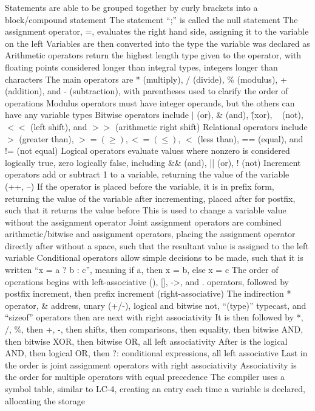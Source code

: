 \documentclass[11 pt, twoside]{article}
\newenvironment{outline*}
{
	\begin{outline}[enumerate]
	}
	{\end{outline}
}
\begin{document}
\begin{outline*}
\2 Statements are able to be grouped together by curly brackets into a block/compound statement
\2 The statement ``;'' is called the null statement
\2 The assignment operator, =, evaluates the right hand side, assigning it to the variable on the left
\3 Variables are then converted into the type the variable was declared as
\2 Arithmetic operators return the highest length type given to the operator, with floating points considered longer than integral types, integers longer than characters
\3 The main operators are * (multiply), / (divide), \% (modulus), +(addition), and - (subtraction), with parentheses used to clarify the order of operations
\3 Modulus operators must have integer operands, but the others can have any variable types
\2 Bitwise operators include $|$ (or), \& (and), \^ (xor), ~ (not), $<<$ (left shift), and $>>$ (arithmetic right shift)
\2 Relational operators include $>$ (greater than), $>= (\geq), <= (\leq)$, $<$ (less than), == (equal), and != (not equal)
\2 Logical operators evaluate values where nonzero is considered logically true, zero logically false, including \&\& (and), || (or), ! (not)
\2 Increment operators add or subtract 1 to a variable, returning the value of the variable (++, --)
\3 If the operator is placed before the variable, it is in prefix form, returning the value of the variable after incrementing, placed after for postfix, such that it returns the value before
\3 This is used to change a variable value without the assignment operator
\2 Joint assignment operators are combined arithmetic/bitwise and assignment operators, placing the assignment operator directly after without a space, such that the resultant value is assigned to the left variable
\2 Conditional operators allow simple decisions to be made, such that it is written ``x = a ? b : c'', meaning if a, then x = b, else x = c
\2 The order of operations begins with left-associative (), [], ->, and . operators, followed by postfix increment, then prefix increment (right-associative)
\3 The indirection * operator, \& address, unary (+/-), logical and bitwise not, ``(type)'' typecast, and ``sizeof'' operators then are next with right associativity
\3 It is then followed by *, /, \%, then +, -, then shifts, then comparisons, then equality, then bitwise AND, then bitwise XOR, then bitwise OR, all left associativity
\3 After is the logical AND, then logical OR, then ?: conditional expressions, all left associative
\3 Last in the order is joint assignment operators with right associativity
\3 Associativity is the order for multiple operators with equal precedence
\1 The compiler uses a symbol table, similar to LC-4, creating an entry each time a variable is declared, allocating the storage

\end{outline*}
\end{document}
